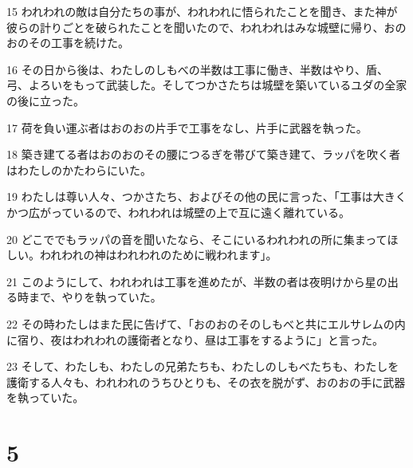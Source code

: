 \par 15 われわれの敵は自分たちの事が、われわれに悟られたことを聞き、また神が彼らの計りごとを破られたことを聞いたので、われわれはみな城壁に帰り、おのおのその工事を続けた。
\par 16 その日から後は、わたしのしもべの半数は工事に働き、半数はやり、盾、弓、よろいをもって武装した。そしてつかさたちは城壁を築いているユダの全家の後に立った。
\par 17 荷を負い運ぶ者はおのおの片手で工事をなし、片手に武器を執った。
\par 18 築き建てる者はおのおのその腰につるぎを帯びて築き建て、ラッパを吹く者はわたしのかたわらにいた。
\par 19 わたしは尊い人々、つかさたち、およびその他の民に言った、「工事は大きくかつ広がっているので、われわれは城壁の上で互に遠く離れている。
\par 20 どこででもラッパの音を聞いたなら、そこにいるわれわれの所に集まってほしい。われわれの神はわれわれのために戦われます」。
\par 21 このようにして、われわれは工事を進めたが、半数の者は夜明けから星の出る時まで、やりを執っていた。
\par 22 その時わたしはまた民に告げて、「おのおのそのしもべと共にエルサレムの内に宿り、夜はわれわれの護衛者となり、昼は工事をするように」と言った。
\par 23 そして、わたしも、わたしの兄弟たちも、わたしのしもべたちも、わたしを護衛する人々も、われわれのうちひとりも、その衣を脱がず、おのおの手に武器を執っていた。

\chapter{5}

